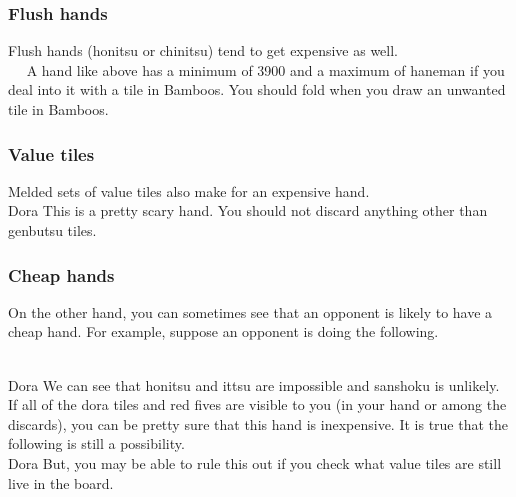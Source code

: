 {{\subsubsection*{Flush hands}

Flush hands ({\jap honitsu} or {\jap chinitsu}) tend to get expensive as well. 
\vspace{-20pt}
\bp
{}\\ \vspace{-18pt}
~\rfs~
\ep
A hand like above has a minimum of 3900 and a maximum of {\jap haneman} if you deal into it with a tile in Bamboos. You should fold when you draw an unwanted tile in Bamboos.

\subsubsection*{Value tiles}

Melded sets of value tiles also make for an expensive hand. 
\bp
{}
\rbai\bai\bai~~\dong\dong\rdong~~\\
\hspace{330pt}\footnotesize{\jap Dora}
\ep
This is a pretty scary hand. You should not discard anything other than {\jap genbutsu} tiles. 

\bigskip
\subsubsection*{Cheap hands}

On the other hand, you can sometimes see that an opponent is likely to have a cheap hand. For example, suppose an opponent is doing the following. 

\bp
{}
~
~~\\
\hspace{330pt}\footnotesize{\jap Dora}
\ep
We can see that {\jap honitsu} and {\jap ittsu} are impossible and {\jap sanshoku} is unlikely. If all of the {\jap dora} tiles and red fives are visible to you (in your hand or among the discards), you can be pretty sure that this hand is inexpensive. It is true that the following is still a possibility. 
\bp
\bai\bai\bai\fa\fa\fa\zhong~
~
~~\\
\hspace{330pt}\footnotesize{\jap Dora}
\ep
But, you may be able to rule this out if you check what value tiles are still live in the board. 

}}
